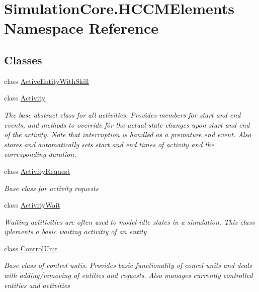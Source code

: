 \hypertarget{namespace_simulation_core_1_1_h_c_c_m_elements}{}\section{Simulation\+Core.\+H\+C\+C\+M\+Elements Namespace Reference}
\label{namespace_simulation_core_1_1_h_c_c_m_elements}
\subsection*{Classes}
\begin{DoxyCompactItemize}
\item 
class \hyperlink{class_simulation_core_1_1_h_c_c_m_elements_1_1_active_entity_with_skill}{Active\+Entity\+With\+Skill}
\item 
class \hyperlink{class_simulation_core_1_1_h_c_c_m_elements_1_1_activity}{Activity}
\begin{DoxyCompactList}\small\item\em The base abstract class for all activities. Provides members for start and end events, and methods to override fór the actual state changes upon start and end of the activity. Note that interruption is handled as a premature end event. Also stores and automatically sets start and end times of activity and the corresponding duration. \end{DoxyCompactList}\item 
class \hyperlink{class_simulation_core_1_1_h_c_c_m_elements_1_1_activity_request}{Activity\+Request}
\begin{DoxyCompactList}\small\item\em Base class for activity requests \end{DoxyCompactList}\item 
class \hyperlink{class_simulation_core_1_1_h_c_c_m_elements_1_1_activity_wait}{Activity\+Wait}
\begin{DoxyCompactList}\small\item\em Waiting actitivities are often used to model idle states in a simulation. This class iplements a basic waiting activitiy of an entity \end{DoxyCompactList}\item 
class \hyperlink{class_simulation_core_1_1_h_c_c_m_elements_1_1_control_unit}{Control\+Unit}
\begin{DoxyCompactList}\small\item\em Base class of control untis. Provides basic functionality of conrol units and deals with adding/removing of entities and requests. Also manages currently controlled entities and activities \end{DoxyCompactList}\item 

\end{DoxyCompactItemize}

